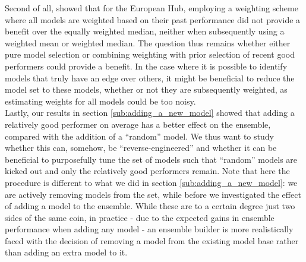 Second of all, \cite{sherratt_european_2022} showed that for the European Hub, employing a weighting scheme where all models are weighted based on their past performance did not provide a benefit over the equally weighted median, neither when subsequently using a weighted mean or weighted median. The question thus remains whether either pure model selection or combining weighting with prior selection of recent good performers could provide a benefit. In the case where it is possible to identify models that truly have an edge over others, it might be beneficial to reduce the model set to these models, whether or not they are subsequently weighted, as estimating weights for all models could be too noisy.\\ %
Lastly, our results in section \ref{sub:adding_a_new_model} showed that adding a relatively good performer on average has a better effect on the ensemble, compared with the addition of a ``random'' model. We thus want to study whether this can, somehow, be ``reverse-engineered'' and whether it can be beneficial to purposefully tune the set of models such that ``random'' models are kicked out and only the relatively good performers remain. Note that here the procedure is different to what we did in section \ref{sub:adding_a_new_model}: we are actively removing models from the set, while before we investigated the effect of adding a model to the ensemble. While these are to a certain degree just two sides of the same coin, in practice - due to the expected gains in ensemble performance when adding any model - an ensemble builder is more realistically faced with the decision of removing a model from the existing model base rather than adding an extra model to it. \medskip \\ %
